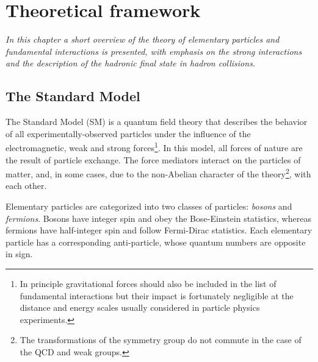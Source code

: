 %
%
\chapter{Theoretical framework}\label{ch:theory}

{\it In this chapter a short overview of the theory of elementary particles and fundamental interactions is presented, with emphasis on the strong interactions and the description of the hadronic final state in hadron collisions.}

\section{The Standard Model}\label{sec:qcdintro}

The Standard Model (SM) is a quantum field theory that describes the behavior of all experimentally-observed particles under the influence of the electromagnetic, weak and strong forces\footnote{In principle gravitational forces should also be included in the list of fundamental interactions but their impact is  fortunately negligible at the distance and energy scales usually considered in particle physics experiments.}. In this model, all forces of nature are the result of particle exchange. The force mediators interact on the particles of matter, and, in some cases, due to the non-Abelian character of the theory\footnote{The transformations of the symmetry group do not commute in the case of the QCD and weak groups.}, with each other.

Elementary particles are categorized into two classes of particles: \emph{bosons} and \emph{fermions}. Bosons have integer spin and obey the Bose-Einstein statistics, whereas fermions have half-integer spin and follow Fermi-Dirac statistics.  Each elementary particle has a corresponding anti-particle, whose quantum numbers are opposite in sign.

